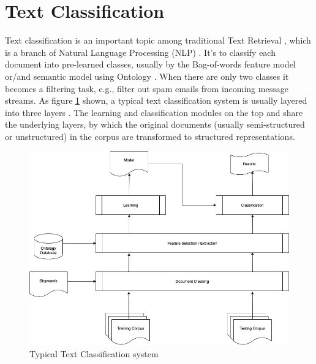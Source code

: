 \documentclass{article}
\begin{document}
\section{Text Classification}

Text classification is an important topic among traditional Text Retrieval \cite{trec}, which is a branch of Natural Language Processing (NLP) \cite{chowdhury2003natural}. It's to classify each document into pre-learned classes, usually by the Bag-of-words feature model \cite{bag-of-words} or/and semantic model \cite{semantic-text-classification} using Ontology \cite{ontology-learning}. When there are only two classes it becomes a filtering task, e.g., filter out spam emails from incoming message streams. As figure \ref{fig:text-classification} shown, a typical text classification system is usually layered into three layers \cite{document-cleaning}. The learning and classification modules on the top and share the underlying layers, by which the original documents (usually semi-structured or unstructured) in the corpus are transformed to structured representations. 

\begin{figure}[!ht]
	\centering
	\includegraphics[scale=0.45]{img/text-classification.jpg}
	\caption{Typical Text Classification system}
	\label{fig:text-classification}
\end{figure}
\end{document}
